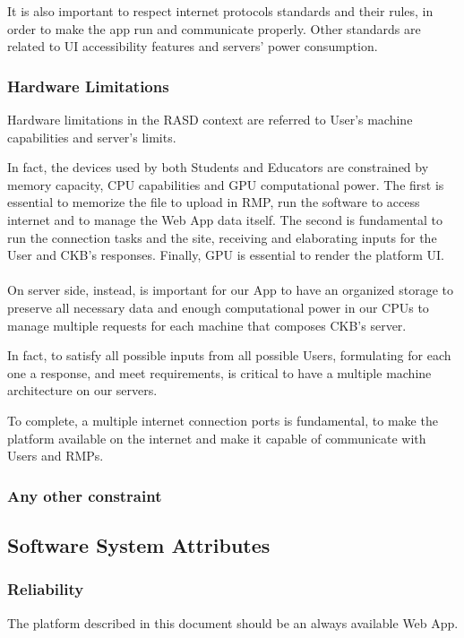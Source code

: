 It is also important to respect internet protocols standards and their rules, in order to make the app run and communicate properly. Other standards are related to UI accessibility features and servers' power consumption. 

\subsubsection{Hardware Limitations}
Hardware limitations in the RASD context are referred to User's machine capabilities and server's limits. 

In fact, the devices used by both Students and Educators are constrained by memory capacity, CPU capabilities and GPU computational power. The first is essential to memorize the file to upload in RMP, run the software to access internet
 and to manage the Web App data itself. The second is fundamental to run the connection tasks and the site, receiving and elaborating inputs for the User and CKB's responses. Finally, GPU is essential to render the platform UI.\\
\\
 On server side, instead, is important for our App to have an organized storage to preserve all necessary data and enough computational power in our CPUs to manage multiple requests for each machine that composes CKB's server. 
 
In fact, to satisfy all possible inputs from all possible Users, formulating for each one a response, and meet requirements, is critical to have a multiple machine architecture on our servers. 

To complete, a multiple internet connection ports is fundamental, to make the platform available on the internet and make it capable of communicate with Users and RMPs.
\subsubsection{Any other constraint}

\subsection{Software System Attributes}

\subsubsection{Reliability}
The platform described in this document should be an always available Web App. 

